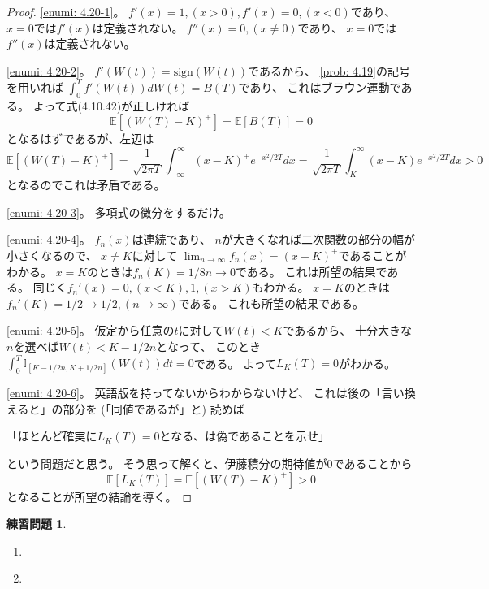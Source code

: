 \documentclass[uplatex]{jsarticle}
\theoremstyle{definition}
\newtheorem{prob}[prob]{練習問題}
\def\E{\mathbb{E}}
\def\I{\mathbb{I}}
\begin{document}
\begin{proof}
  \ref{enumi: 4.20-1}。
  \(f'(x) = 1 , ( x > 0), f'(x) = 0 , (x<0)\)であり、
  \(x=0\)では\(f'(x)\)は定義されない。
  \(f''(x) = 0 , (x\neq 0)\)であり、
  \(x=0\)では\(f''(x)\)は定義されない。

  \ref{enumi: 4.20-2}。
  \(f'(W(t)) = \mathrm{sign}(W(t))\)であるから、
  \autoref{prob: 4.19}の記号を用いれば
  \(\int_0^Tf'(W(t))dW(t) = B(T)\)であり、
  これはブラウン運動である。
  よって式(4.10.42)が正しければ
  \[
  \E[(W(T)-K)^+] = \E[B(T)] = 0
  \]
  となるはずであるが、左辺は
  \[
  \E[(W(T)-K)^+]
  = \frac{1}{\sqrt{2\pi T}}\int_{-\infty}^{\infty}(x-K)^+e^{-x^2/2T}dx
  = \frac{1}{\sqrt{2\pi T}}\int_K^{\infty}(x-K)e^{-x^2/2T}dx
  > 0
  \]
  となるのでこれは矛盾である。

  \ref{enumi: 4.20-3}。
  多項式の微分をするだけ。

  \ref{enumi: 4.20-4}。
  \(f_n(x)\)は連続であり、
  \(n\)が大きくなれば二次関数の部分の幅が小さくなるので、
  \(x\neq K\)に対して
  \(\lim _{n\to \infty}f_n(x) = (x-K)^+\)であることがわかる。
  \(x=K\)のときは\(f_n(K) = 1/8n \to 0\)である。
  これは所望の結果である。
  同じく\(f_n'(x) = 0, (x < K), 1, (x > K)\)もわかる。
  \(x=K\)のときは\(f_n'(K) = 1/2 \to 1/2 , (n\to \infty )\)である。
  これも所望の結果である。

  \ref{enumi: 4.20-5}。
  仮定から任意の\(t\)に対して\(W(t) < K\)であるから、
  十分大きな\(n\)を選べば\(W(t) < K - 1/2n\)となって、
  このとき\(\int_0^T\I_{[K - 1/2n,K + 1/2n]}(W(t))dt = 0\)である。
  よって\(L_K(T)=0\)がわかる。

  \ref{enumi: 4.20-6}。
  英語版を持ってないからわからないけど、
  これは後の「言い換えると」の部分を
  (「同値であるが」と) 読めば
  \begin{center}
    「ほとんど確実に\(L_K(T)=0\)となる、は偽であることを示せ」
  \end{center}
  という問題だと思う。
  そう思って解くと、伊藤積分の期待値が\(0\)であることから
  \[
  \E[L_K(T)] = \E[(W(T)-K)^+] > 0
  \]
  となることが所望の結論を導く。
\end{proof}


\begin{prob}\label{prob: 4.21}
  \begin{enumerate}
    \item \label{enumi: 4.21-1}
    \item \label{enumi: 4.21-2}
  \end{enumerate}
\end{prob}
\end{document}

